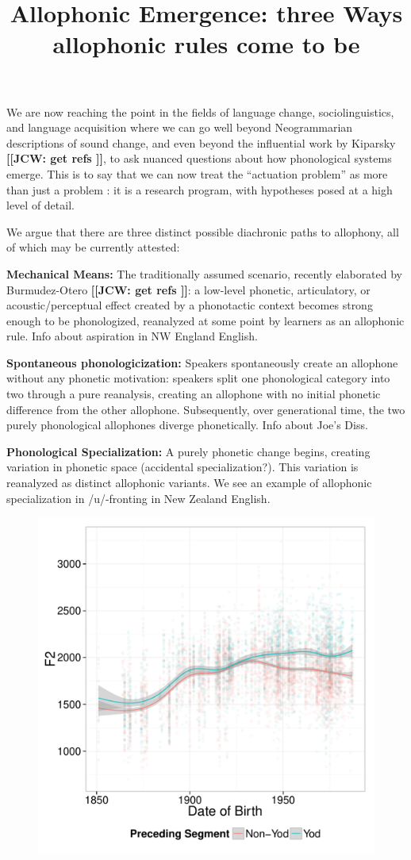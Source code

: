 \documentclass[10pt,letterpaper]{article}
\newcommand{\noteme}[1]{\noindent \textbf{[[JCW:  #1 ]]}}
\begin{document}
\title{Allophonic Emergence: three Ways allophonic rules come to be}
\author{}
\date{}
\maketitle


We are now reaching the point in the fields of language change, sociolinguistics, and language acquisition where we can go well beyond Neogrammarian descriptions of sound change, and even beyond the influential work by Kiparsky \noteme{get refs}, to ask nuanced questions about how phonological systems emerge. This is to say that we can now treat the ``actuation problem'' as more than just a problem \citep{wlh1968}: it is a research program, with hypotheses posed at a high level of detail.

We argue that there are three distinct possible diachronic paths to allophony, all of which may be currently attested:

\textbf{Mechanical Means:} The traditionally assumed scenario, recently elaborated by Burmudez-Otero \noteme{get refs}: a low-level phonetic, articulatory, or acoustic/perceptual effect created by a phonotactic context becomes strong enough to be phonologized, reanalyzed at some point by learners as an allophonic rule. Info about aspiration in NW England English. 

\textbf{Spontaneous phonologicization:} Speakers spontaneously create an allophone without any phonetic motivation: speakers split one phonological category into two through a pure reanalysis, creating an allophone with no initial phonetic difference from the other allophone. Subsequently, over generational time, the two purely phonological allophones diverge phonetically. Info about Joe's Diss.

\textbf{Phonological Specialization:} %
A purely phonetic change begins, creating variation in phonetic space (accidental specialization?). This variation is reanalyzed as distinct allophonic variants. We see an example of allophonic specialization in /u/-fronting in New Zealand English. 

\begin{figure}
\includegraphics[width=0.4\linewidth]{By_Token_Old_Preceding}
\end{figure}
\end{document}
